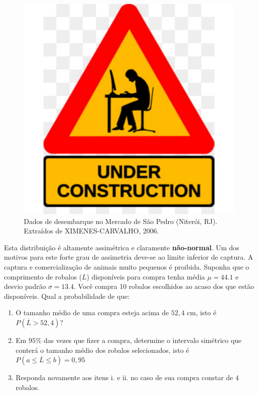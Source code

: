 \documentclass[
]{book}
\providecommand{\tightlist}{%
  \setlength{\itemsep}{0pt}\setlength{\parskip}{0pt}}
\begin{document}
\begin{figure}
\centering
\includegraphics{probest-cambientais_files/figure-latex/unnamed-chunk-233-1.pdf}
\caption{\label{fig:unnamed-chunk-233}Dados de desembarque no Mercado de São Pedro (Niterói, RJ). Extraídos de XIMENES-CARVALHO, 2006.}
\end{figure}

Esta distribuição é altamente assimétrica e claramente \textbf{não-normal}. Um dos motivos para este forte grau de assimetria deve-se ao limite inferior de captura. A captura e comercialização de animais muito pequenos é proibida. Suponha que o comprimento de robalos (\(L\)) disponíveis para compra tenha média \(\mu = 44.1\) e desvio padrão \(\sigma = 13.4\). Você compra 10 robalos escolhidos ao acaso dos que estão disponíveis. Qual a probabilidade de que:

\begin{enumerate}
\def\labelenumi{\roman{enumi}.}
\tightlist
\item
  O tamanho médio de uma compra esteja acima de \(52,4\) cm, isto é \(P(\overline{L} > 52,4)\)?
\item
  Em \(95\%\) das vezes que fizer a compra, determine o intervalo simétrico que conterá o tamanho médio dos robalos selecionados, isto é \(P(a \le \overline{L} \le b) = 0,95\)
\item
  Responda novamente aos itens i. e ii. no caso de sua compra constar de \(4\) robalos.
\end{enumerate}
\end{document}
